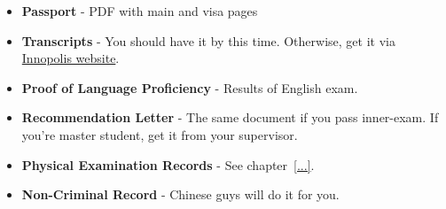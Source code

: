 \begin{itemize}
    \item \textbf{Passport} - PDF with main and visa pages

    \item \textbf{Transcripts} - You should have it by this time.
        Otherwise, get it via
    \href{https://my.university.innopolis.ru/profile/edu-certs/create}{Innopolis website}.

    \item \textbf{Proof of Language Proficiency} - Results of English exam.

    \item \textbf{Recommendation Letter} - The same document if you pass inner-exam.
    If you're master student, get it from your supervisor.

    \item \textbf{Physical Examination Records} - See chapter~\ref{...}.

    \item \textbf{Non-Criminal Record} - Chinese guys will do it for you.
\end{itemize}